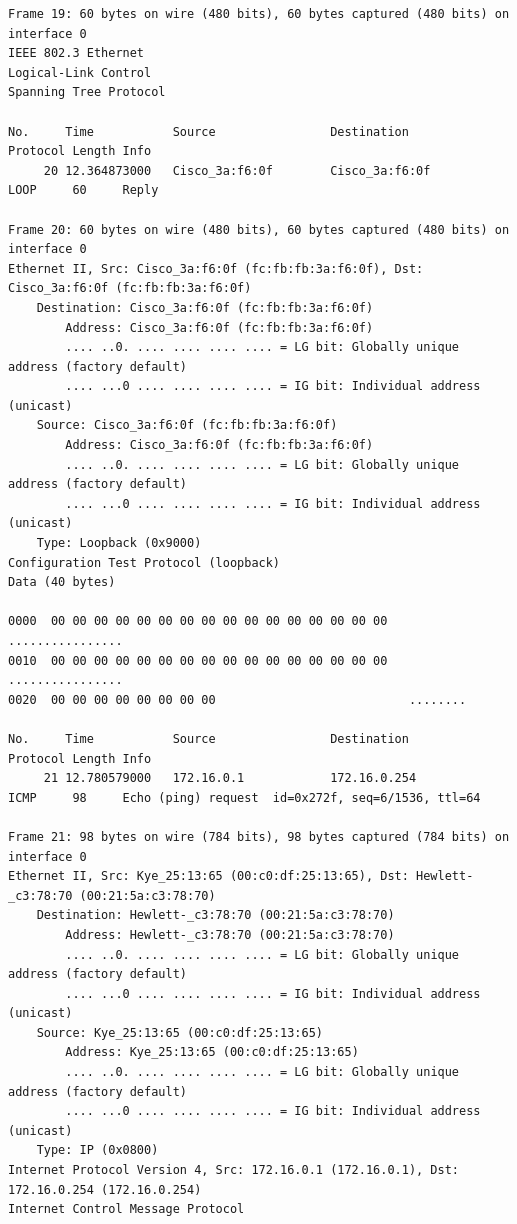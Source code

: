 \documentclass[a4paper,11pt]{article}
\begin{document}
\begin{lstlisting}
Frame 19: 60 bytes on wire (480 bits), 60 bytes captured (480 bits) on interface 0
IEEE 802.3 Ethernet 
Logical-Link Control
Spanning Tree Protocol

No.     Time           Source                Destination           Protocol Length Info
     20 12.364873000   Cisco_3a:f6:0f        Cisco_3a:f6:0f        LOOP     60     Reply

Frame 20: 60 bytes on wire (480 bits), 60 bytes captured (480 bits) on interface 0
Ethernet II, Src: Cisco_3a:f6:0f (fc:fb:fb:3a:f6:0f), Dst: Cisco_3a:f6:0f (fc:fb:fb:3a:f6:0f)
    Destination: Cisco_3a:f6:0f (fc:fb:fb:3a:f6:0f)
        Address: Cisco_3a:f6:0f (fc:fb:fb:3a:f6:0f)
        .... ..0. .... .... .... .... = LG bit: Globally unique address (factory default)
        .... ...0 .... .... .... .... = IG bit: Individual address (unicast)
    Source: Cisco_3a:f6:0f (fc:fb:fb:3a:f6:0f)
        Address: Cisco_3a:f6:0f (fc:fb:fb:3a:f6:0f)
        .... ..0. .... .... .... .... = LG bit: Globally unique address (factory default)
        .... ...0 .... .... .... .... = IG bit: Individual address (unicast)
    Type: Loopback (0x9000)
Configuration Test Protocol (loopback)
Data (40 bytes)

0000  00 00 00 00 00 00 00 00 00 00 00 00 00 00 00 00   ................
0010  00 00 00 00 00 00 00 00 00 00 00 00 00 00 00 00   ................
0020  00 00 00 00 00 00 00 00                           ........

No.     Time           Source                Destination           Protocol Length Info
     21 12.780579000   172.16.0.1            172.16.0.254          ICMP     98     Echo (ping) request  id=0x272f, seq=6/1536, ttl=64

Frame 21: 98 bytes on wire (784 bits), 98 bytes captured (784 bits) on interface 0
Ethernet II, Src: Kye_25:13:65 (00:c0:df:25:13:65), Dst: Hewlett-_c3:78:70 (00:21:5a:c3:78:70)
    Destination: Hewlett-_c3:78:70 (00:21:5a:c3:78:70)
        Address: Hewlett-_c3:78:70 (00:21:5a:c3:78:70)
        .... ..0. .... .... .... .... = LG bit: Globally unique address (factory default)
        .... ...0 .... .... .... .... = IG bit: Individual address (unicast)
    Source: Kye_25:13:65 (00:c0:df:25:13:65)
        Address: Kye_25:13:65 (00:c0:df:25:13:65)
        .... ..0. .... .... .... .... = LG bit: Globally unique address (factory default)
        .... ...0 .... .... .... .... = IG bit: Individual address (unicast)
    Type: IP (0x0800)
Internet Protocol Version 4, Src: 172.16.0.1 (172.16.0.1), Dst: 172.16.0.254 (172.16.0.254)
Internet Control Message Protocol


\end{lstlisting}
\end{document}
